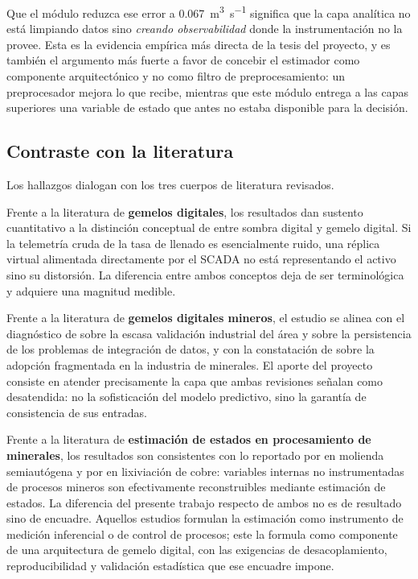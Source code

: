Que el módulo reduzca ese error a \SI{0,067}{\metre\cubed\per\second} significa
que la capa analítica no está limpiando datos sino \emph{creando observabilidad}
donde la instrumentación no la provee. Esta es la evidencia empírica más directa
de la tesis del proyecto, y es también el argumento más fuerte a favor de
concebir el estimador como componente arquitectónico y no como filtro de
preprocesamiento: un preprocesador mejora lo que recibe, mientras que este
módulo entrega a las capas superiores una variable de estado que antes no
estaba disponible para la decisión.

\subsection{Contraste con la literatura}

Los hallazgos dialogan con los tres cuerpos de literatura revisados.

Frente a la literatura de \textbf{gemelos digitales}, los resultados dan
sustento cuantitativo a la distinción conceptual de \textcite{sepasgozar2021}
entre sombra digital y gemelo digital. Si la telemetría cruda de la tasa de
llenado es esencialmente ruido, una réplica virtual alimentada directamente por
el SCADA no está representando el activo sino su distorsión. La diferencia entre
ambos conceptos deja de ser terminológica y adquiere una magnitud medible.

Frente a la literatura de \textbf{gemelos digitales mineros}, el estudio se
alinea con el diagnóstico de \textcite{ebad2026} sobre la escasa validación
industrial del área y sobre la persistencia de los problemas de integración de
datos, y con la constatación de \textcite{qu2023} sobre la adopción fragmentada
en la industria de minerales. El aporte del proyecto consiste en atender
precisamente la capa que ambas revisiones señalan como desatendida: no la
sofisticación del modelo predictivo, sino la garantía de consistencia de sus
entradas.

Frente a la literatura de \textbf{estimación de estados en procesamiento de
minerales}, los resultados son consistentes con lo reportado por
\textcite{apelt2002} en molienda semiautógena y por \textcite{barzaga2025} en
lixiviación de cobre: variables internas no instrumentadas de procesos mineros
son efectivamente reconstruibles mediante estimación de estados. La diferencia
del presente trabajo respecto de ambos no es de resultado sino de encuadre.
Aquellos estudios formulan la estimación como instrumento de medición
inferencial o de control de procesos; este la formula como componente de una
arquitectura de gemelo digital, con las exigencias de desacoplamiento,
reproducibilidad y validación estadística que ese encuadre impone.


